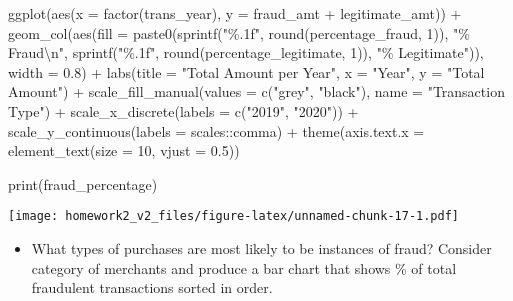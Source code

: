 \documentclass[
]{article}
\newenvironment{Shaded}{\begin{snugshade}}{\end{snugshade}}
\newcommand{\AttributeTok}[1]{\textcolor[rgb]{0.77,0.63,0.00}{#1}}
\newcommand{\DecValTok}[1]{\textcolor[rgb]{0.00,0.00,0.81}{#1}}
\newcommand{\FloatTok}[1]{\textcolor[rgb]{0.00,0.00,0.81}{#1}}
\newcommand{\FunctionTok}[1]{\textcolor[rgb]{0.00,0.00,0.00}{#1}}
\newcommand{\NormalTok}[1]{#1}
\newcommand{\SpecialCharTok}[1]{\textcolor[rgb]{0.00,0.00,0.00}{#1}}
\newcommand{\StringTok}[1]{\textcolor[rgb]{0.31,0.60,0.02}{#1}}
\providecommand{\tightlist}{%
  \setlength{\itemsep}{0pt}\setlength{\parskip}{0pt}}
\begin{document}
\begin{Shaded}
\begin{Highlighting}[]
\FunctionTok{ggplot}\NormalTok{(}\FunctionTok{aes}\NormalTok{(}\AttributeTok{x =} \FunctionTok{factor}\NormalTok{(trans\_year), }\AttributeTok{y =}\NormalTok{ fraud\_amt }\SpecialCharTok{+}\NormalTok{ legitimate\_amt)) }\SpecialCharTok{+}
  \FunctionTok{geom\_col}\NormalTok{(}\FunctionTok{aes}\NormalTok{(}\AttributeTok{fill =} \FunctionTok{paste0}\NormalTok{(}\FunctionTok{sprintf}\NormalTok{(}\StringTok{"\%.1f"}\NormalTok{, }\FunctionTok{round}\NormalTok{(percentage\_fraud, }\DecValTok{1}\NormalTok{)), }\StringTok{"\% Fraud}\SpecialCharTok{\textbackslash{}n}\StringTok{"}\NormalTok{, }\FunctionTok{sprintf}\NormalTok{(}\StringTok{"\%.1f"}\NormalTok{, }\FunctionTok{round}\NormalTok{(percentage\_legitimate, }\DecValTok{1}\NormalTok{)), }\StringTok{"\% Legitimate"}\NormalTok{)), }\AttributeTok{width =} \FloatTok{0.8}\NormalTok{) }\SpecialCharTok{+}
  \FunctionTok{labs}\NormalTok{(}\AttributeTok{title =} \StringTok{"Total Amount per Year"}\NormalTok{, }\AttributeTok{x =} \StringTok{"Year"}\NormalTok{, }\AttributeTok{y =} \StringTok{"Total Amount"}\NormalTok{) }\SpecialCharTok{+}
  \FunctionTok{scale\_fill\_manual}\NormalTok{(}\AttributeTok{values =} \FunctionTok{c}\NormalTok{(}\StringTok{"grey"}\NormalTok{, }\StringTok{"black"}\NormalTok{), }\AttributeTok{name =} \StringTok{"Transaction Type"}\NormalTok{) }\SpecialCharTok{+}
  \FunctionTok{scale\_x\_discrete}\NormalTok{(}\AttributeTok{labels =} \FunctionTok{c}\NormalTok{(}\StringTok{"2019"}\NormalTok{, }\StringTok{"2020"}\NormalTok{)) }\SpecialCharTok{+}
  \FunctionTok{scale\_y\_continuous}\NormalTok{(}\AttributeTok{labels =}\NormalTok{ scales}\SpecialCharTok{::}\NormalTok{comma) }\SpecialCharTok{+}
  \FunctionTok{theme}\NormalTok{(}\AttributeTok{axis.text.x =} \FunctionTok{element\_text}\NormalTok{(}\AttributeTok{size =} \DecValTok{10}\NormalTok{, }\AttributeTok{vjust =} \FloatTok{0.5}\NormalTok{))}

\FunctionTok{print}\NormalTok{(fraud\_percentage)}
\end{Highlighting}
\end{Shaded}

\texttt{[image: homework2\_v2\_files/figure-latex/unnamed-chunk-17-1.pdf]}

\begin{itemize}
\tightlist
\item
  What types of purchases are most likely to be instances of fraud?
  Consider category of merchants and produce a bar chart that shows \%
  of total fraudulent transactions sorted in order.
\end{itemize}
\end{document}
